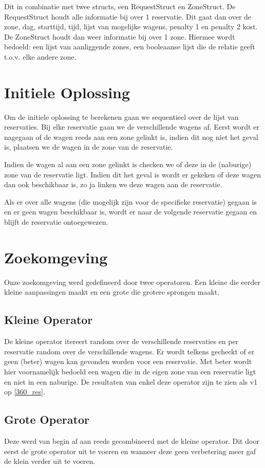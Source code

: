 \documentclass[a4paper, 12pt, one column]{article}
\begin{document}
Dit in combinatie met twee structs, een RequestStruct en ZoneStruct. De RequestStruct houdt alle informatie bij over 1 reservatie. Dit gaat dan over de zone, dag, starttijd, tijd, lijst van mogelijke wagens, penalty 1 en penalty 2 kost. De ZoneStruct houdt dan weer informatie bij over 1 zone. Hiermee wordt bedoeld: een lijst van aanliggende zones, een booleaanse lijst die de relatie geeft t.o.v. elke andere zone.


\section{Initiele Oplossing}
Om de initiele oplossing te berekenen gaan we sequentieel over de lijst van reservaties. Bij elke reservatie gaan we de verschillende wagens af. Eerst wordt er nagegaan of de wagen reeds aan een zone gelinkt is, indien dit nog niet het geval is, plaatsen we de wagen in de zone van de reservatie. 

Indien de wagen al aan een zone gelinkt is checken we of deze in de (naburige) zone van de reservatie ligt. Indien dit het geval is wordt er gekeken of deze wagen dan ook beschikbaar is, zo ja linken we deze wagen aan de reservatie.

Als er over alle wagens (die mogelijk zijn voor de specifieke reservatie) gegaan is en er geen wagen beschikbaar is, wordt er naar de volgende reservatie gegaan en blijft de reservatie ontoegewezen.

\section{Zoekomgeving}
Onze zoekomgeving werd gedefineerd door twee operatoren. Een kleine die eerder kleine aanpassingen maakt en een grote die grotere sprongen maakt.

\subsection{Kleine Operator}
De kleine operator itereert random over de verschillende reservaties en per reservatie random over de verschillende wagens. Er wordt telkens gecheckt of er geen (beter) wagen kan gevonden worden voor een reservatie. Met beter wordt hier voornamelijk bedoeld een wagen die in de eigen zone van een reservatie ligt en niet in een naburige. De resultaten van enkel deze operator zijn te zien als v1 op \ref{360_res}.

\subsection{Grote Operator}
Deze werd van begin af aan reeds gecombineerd met de kleine operator. Dit door eerst de grote operator uit te voeren en wanneer deze geen verbetering meer gaf de klein verder uit te voeren.
\end{document}
